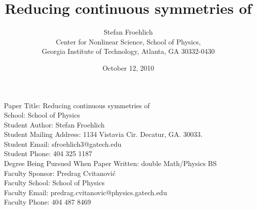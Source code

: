 
\noindent
Paper Title: Reducing continuous symmetries of \cLe
\\School: School of Physics
\\Student Author: Stefan Froehlich
\\Student Mailing Address: 1134 Vistavia Cir. Decatur, GA. 30033.
\\Student Email: sfroehlich3@gatech.edu
\\Student Phone: 404 325 1187
\\Degree Being Pursued When Paper Written: double Math/Physics BS
\\Faculty Sponsor: Predrag Cvitanovi\'{c}
\\Faculty School: School of Physics
\\Faculty Email: predrag.cvitanovic@physics.gatech.edu
\\Faculty Phone: 404 487 8469
\newpage

        \title{Reducing continuous symmetries of \cLe}
        \author{
Stefan Froehlich
\\
Center for Nonlinear Science, School of Physics,
\\
Georgia Institute of Technology,
Atlanta, GA 30332-0430
        }
        \date{October 12, 2010} \Private{\date{\today}}

    \ifarticle
    \else
    \fi %

